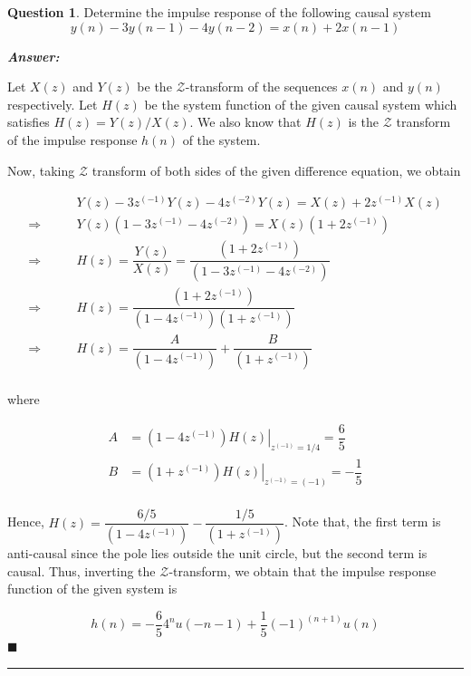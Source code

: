 \documentclass[12pt]{article}
\theoremstyle{definition}
\newtheorem{question}{Question}
\newenvironment{answer}{
    \textbf{\textit{Answer:}} \qquad
}{\hfill $\blacksquare$ \\ 

\begin{center}
    \rule{0.8\linewidth}{1.5px} 
    \vspace*{1cm}   
\end{center}
}
\newcommand{\zcal}{\mathcal{Z}}
\newcommand{\inv}[1][1]{^{(- #1)}}
\begin{document}
\begin{question}
    Determine the impulse response of the following causal system 
    $$
    y(n) - 3 y(n-1) - 4y(n-2) = x(n) + 2x(n-1)
    $$
\end{question}

\begin{answer}
    Let $X(z)$ and $Y(z)$ be the $\zcal$-transform of the sequences $x(n)$ and $y(n)$ respectively. Let $H(z)$ be the system function of the given causal system which satisfies $H(z) = Y(z)/X(z)$. We also know that $H(z)$ is the $\zcal$ transform of the impulse response $h(n)$ of the system. 

    Now, taking $\zcal$ transform of both sides of the given difference equation, we obtain 

    \begin{align*}
        & Y(z) - 3 z\inv Y(z) - 4 z\inv[2] Y(z) = X(z) + 2 z\inv X(z)\\
        \Rightarrow \qquad & Y(z) \left( 1 - 3z\inv - 4z\inv[2] \right) = X(z) (1 + 2z\inv)\\
        \Rightarrow \qquad & H(z) = \dfrac{Y(z)}{X(z)} = \dfrac{(1 + 2z\inv)}{(1 - 3z\inv - 4z\inv[2])}\\
        \Rightarrow \qquad & H(z) = \dfrac{(1 + 2z\inv)}{(1 - 4z\inv)(1 + z\inv)}\\
        \Rightarrow \qquad & H(z) = \dfrac{A}{(1 - 4z\inv)} + \dfrac{B}{(1 + z\inv)}\\
    \end{align*}

    where 

    \begin{align*}
        A & = \left. (1 - 4z\inv)H(z) \right\vert_{z\inv = 1/4} = \dfrac{6}{5}\\
        B & = \left. (1 + z\inv)H(z) \right\vert_{z\inv = (-1)} = -\dfrac{1}{5}\\
    \end{align*}

    Hence, $H(z) = \dfrac{6/5}{(1 - 4z\inv)} - \dfrac{1/5}{(1 + z\inv)}$. Note that, the first term is anti-causal since the pole lies outside the unit circle, but the second term is causal. Thus, inverting the $\zcal$-transform, we obtain that the impulse response function of the given system is
    
    $$
    h(n) = -\dfrac{6}{5} 4^n u(-n-1) + \dfrac{1}{5} (-1)^{(n+1)} u(n)
    $$
\end{answer}
\end{document}
